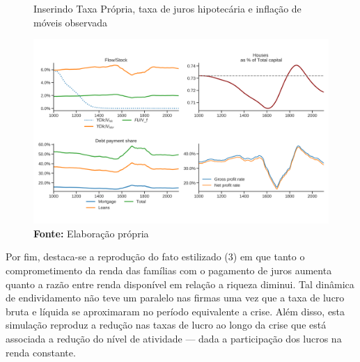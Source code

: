 \begin{figure}[H]
	\centering
	\caption{Inserindo Taxa Própria, taxa de juros hipotecária e inflação de móveis observada}
	\label{choque_RealNorms}
	\includegraphics[width=\textwidth]{../../Modelo/Versoes/Shock_RealNorms.png}
	\caption*{\textbf{Fonte:} Elaboração própria}
\end{figure}

Por fim, destaca-se a reprodução do fato estilizado (3) em que tanto o comprometimento da renda das famílias com o pagamento de juros aumenta quanto a razão entre renda disponível em relação a riqueza diminui. Tal dinâmica de endividamento não teve um paralelo nas firmas uma vez que a taxa de lucro bruta e líquida se aproximaram no período equivalente a crise. Além disso, esta simulação reproduz a redução nas taxas de lucro ao longo da crise que está associada a redução do nível de atividade --- dada a participação dos lucros na renda constante.

